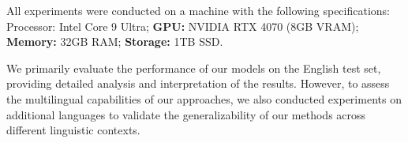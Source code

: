 
All experiments were conducted on a machine with the following specifications: {Processor:} Intel Core 9 Ultra; \textbf{GPU:} NVIDIA RTX 4070 (8GB VRAM); \textbf{Memory:} 32GB RAM; \textbf{Storage:} 1TB SSD.


We primarily evaluate the performance of our models on the English test set, providing detailed analysis and interpretation of the results. %
However, to assess the multilingual capabilities of our approaches, we also conducted experiments on additional languages to validate the generalizability of our methods across different linguistic contexts.